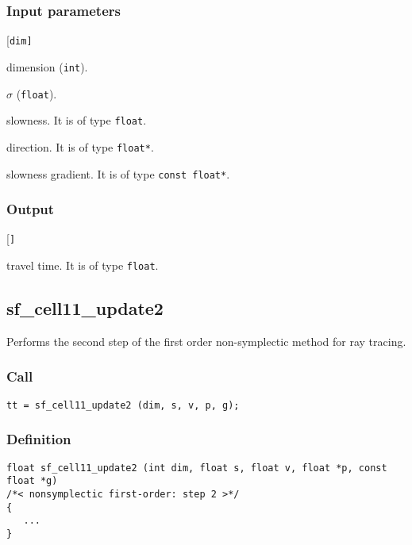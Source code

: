 \subsubsection*{Input parameters}
\begin{desclist}{\tt }{\quad}[\tt dim]
   \setlength\itemsep{0pt}
   \item[dim] dimension (\texttt{int}).  
   \item[s]   $\sigma$ (\texttt{float}).
   \item[v]   slowness. It is of type \texttt{float}.
   \item[p]   direction. It is of type \texttt{float*}.
   \item[g]   slowness gradient. It is of type \texttt{const float*}.
\end{desclist}

\subsubsection*{Output}
\begin{desclist}{\tt }{\quad}[\tt ]
   \setlength\itemsep{0pt}  
   \item[0.5*v*v*s*(1. + s*pg)] travel time. It is of type \texttt{float}.
\end{desclist}




\subsection{{sf\_cell11\_update2}}
Performs the second step of the first order non-symplectic method for ray tracing.


\subsubsection*{Call}
\begin{verbatim}tt = sf_cell11_update2 (dim, s, v, p, g);\end{verbatim}


\subsubsection*{Definition}
\begin{verbatim}
float sf_cell11_update2 (int dim, float s, float v, float *p, const float *g) 
/*< nonsymplectic first-order: step 2 >*/
{
   ...
}
\end{verbatim}

